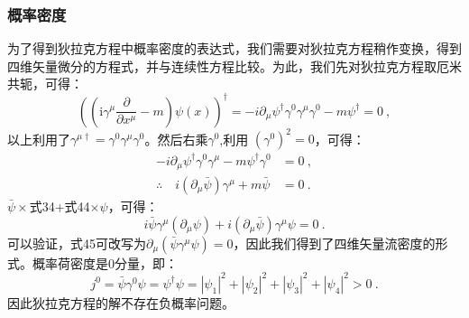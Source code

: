 \subsubsection{概率密度}
为了得到狄拉克方程中概率密度的表达式，我们需要对狄拉克方程稍作变换，得到四维矢量微分的方程式，并与连续性方程比较。为此，我们先对狄拉克方程取厄米共轭，可得：
\begin{equation}
\left(\left(\mathrm{i} \gamma^{\mu} \frac{\partial}{\partial x^{\mu}}-m\right) \psi(x)\right)^{\dagger}=-i \partial_{\mu} \psi^{\dagger} \gamma^{0} \gamma^{\mu} \gamma^{0}-m \psi^{\dagger}=0~,
\end{equation}
以上利用了$\gamma^{\mu \dagger}=\gamma^{0} \gamma^{\mu} \gamma^{0}$。然后右乘$\gamma ^0$,利用 $(\gamma^{0})^2=0$，可得：
\begin{equation}
\begin{aligned}
-i \partial_{\mu} \psi^{\dagger} \gamma^{0} \gamma^{\mu}-m \psi^{\dagger} \gamma^{0}&=0~,\\
\therefore\quad i\left(\partial_{\mu} \bar{\psi}\right) \gamma^{\mu}+m \bar{\psi}&=0~.
\end{aligned}
\end{equation}
$\bar\psi\times$式34+式44$\times\psi$，可得：
\begin{equation}
i \bar{\psi} \gamma^{\mu}\left(\partial_{\mu} \psi\right)+i\left(\partial_{\mu} \bar{\psi}\right) \gamma^{\mu} \psi=0~.
\end{equation}
可以验证，式45可改写为$\partial_{\mu}\left(\bar{\psi} \gamma^{\mu} \psi\right)=0$，因此我们得到了四维矢量流密度的形式。概率荷密度是0分量，即：\begin{equation}\label{eq_qed4_24}
j^0=\bar{\psi} \gamma^{0} \psi=\psi^{\dagger}\psi=\left|\psi_{1}\right|^{2}+\left|\psi_{2}\right|^{2}+\left|\psi_{3}\right|^{2}+\left|\psi_{4}\right|^{2}>0~.
\end{equation}
因此狄拉克方程的解不存在负概率问题。
